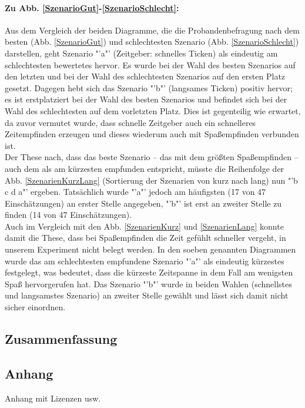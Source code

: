 \documentclass{Paper}
\begin{document}
\paragraph{Zu Abb. \ref{SzenarioGut}-\ref{SzenarioSchlecht}:} Aus dem Vergleich der beiden Diagramme, die die Probandenbefragung nach dem besten (Abb. \ref{SzenarioGut}) und schlechtesten Szenario (Abb. \ref{SzenarioSchlecht}) darstellen, geht Szenario "'a"' (Zeitgeber: schnelles Ticken) als eindeutig am schlechtesten bewertetes hervor. Es wurde bei der Wahl des besten Szenarios auf den letzten und bei der Wahl des schlechtesten Szenarios auf den ersten Platz gesetzt. Dagegen hebt sich das Szenario "'b"' (langsames Ticken) positiv hervor; es ist erstplatziert bei der Wahl des besten Szenarios und befindet sich bei der Wahl des schlechtesten auf dem vorletzten Platz. Dies ist gegenteilig wie erwartet, da zuvor vermutet wurde, dass schnelle Zeitgeber auch ein schnelleres Zeitempfinden erzeugen und dieses wiederum auch mit Spaßempfinden verbunden ist.\\
Der These nach, dass das beste Szenario -- das mit dem größten Spaßempfinden -- auch dem als am kürzesten empfunden entspricht, müsste die Reihenfolge der Abb. \ref{SzenarienKurzLang} (Sortierung der Szenarien von kurz nach lang) nun "'b c d a"' ergeben. Tatsächlich wurde "'a"' jedoch am häufigsten (17 von 47 Einschätzungen) an erster Stelle angegeben, "'b"' ist erst an zweiter Stelle zu finden (14 von 47 Einschätzungen).\\ 
Auch im Vergleich mit den Abb. \ref{SzenarienKurz} und \ref{SzenarienLang} konnte damit die These, dass bei Spaßempfinden die Zeit gefühlt schneller vergeht, in unserem Experiment nicht belegt werden. In den soeben genannten Diagrammen wurde das am schlechtesten empfundene Szenario "'a"' als eindeutig kürzestes festgelegt, was bedeutet, dass die kürzeste Zeitspanne in dem Fall am wenigsten Spaß hervorgerufen hat. Das Szenario "'b"' wurde in beiden Wahlen (schnellstes und langsamstes Szenario) an zweiter Stelle gewählt und lässt sich damit nicht sicher einordnen.\\

\subsection{Zusammenfassung}





\begin{appendix}
\section{Anhang}
	Anhang mit Lizenzen usw.
\end{appendix}	

\vfill %
\end{document}
